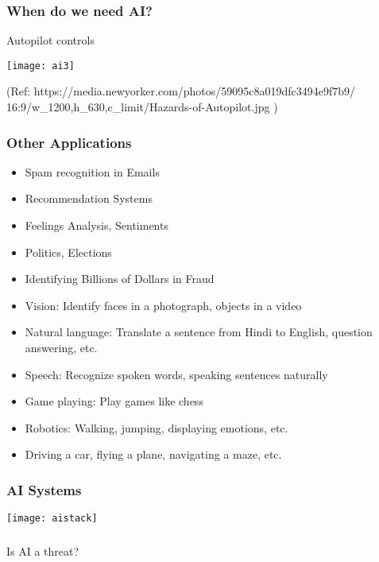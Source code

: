 \begin{frame}[fragile]\frametitle{When do we need AI?}
 Autopilot controls
\begin{center}
\texttt{[image: ai3]}
\end{center}

{\tiny (Ref:  https://media.newyorker.com/photos/59095c8a019dfc3494e9f7b9/ 16:9/w\_1200,h\_630,c\_limit/Hazards-of-Autopilot.jpg )}
\end{frame}

\begin{frame}[fragile]\frametitle{Other Applications}
\begin{itemize}
\item Spam recognition in Emails
\item Recommendation Systems
\item Feelings Analysis, Sentiments
\item Politics, Elections
\item Identifying Billions of Dollars in Fraud
\item Vision: Identify faces in a photograph, objects in a video
\item Natural language: Translate a sentence from Hindi to English, question answering, etc. 
\item Speech: Recognize spoken words, speaking sentences naturally 
\item Game playing: Play games like chess 
\item Robotics: Walking, jumping, displaying emotions, etc. 
\item Driving a car, flying a plane, navigating a maze, etc.
\end{itemize}
\end{frame}

\begin{frame}[fragile]\frametitle{AI Systems}
\begin{center}
\texttt{[image: aistack]}
\end{center}
\end{frame}


\begin{frame}[fragile]\frametitle{}
\begin{center}
{\Large Is AI a threat?}
\end{center}
\end{frame}

